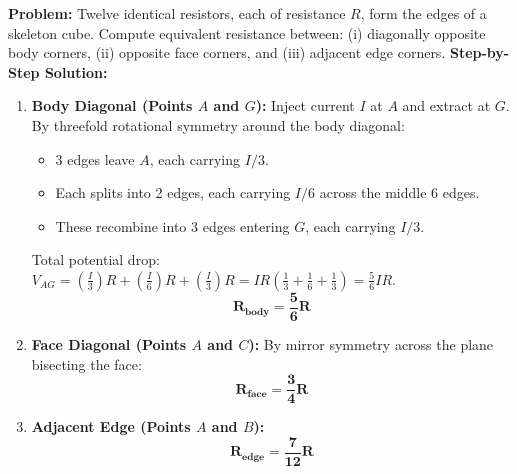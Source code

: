\documentclass[10pt,twoside,openright]{book}
\begin{document}
\begin{usecasebox}
\textbf{Problem:} Twelve identical resistors, each of resistance $R$, form the edges of a skeleton cube. Compute equivalent resistance between: (i) diagonally opposite body corners, (ii) opposite face corners, and (iii) adjacent edge corners.
\textbf{Step-by-Step Solution:}
\begin{enumerate}
  \item \textbf{Body Diagonal (Points $A$ and $G$):}
  Inject current $I$ at $A$ and extract at $G$. By threefold rotational symmetry around the body diagonal:
  \begin{itemize}
    \item 3 edges leave $A$, each carrying $I/3$.
    \item Each splits into 2 edges, each carrying $I/6$ across the middle 6 edges.
    \item These recombine into 3 edges entering $G$, each carrying $I/3$.
  \end{itemize}
  Total potential drop: $V_{AG} = \left(\frac{I}{3}\right)R + \left(\frac{I}{6}\right)R + \left(\frac{I}{3}\right)R = I R \left(\frac{1}{3} + \frac{1}{6} + \frac{1}{3}\right) = \frac{5}{6} I R$.
  \begin{equation}
    \mathbf{R_{\text{body}} = \frac{5}{6} R}
  \end{equation}
  \item \textbf{Face Diagonal (Points $A$ and $C$):}
  By mirror symmetry across the plane bisecting the face:
  \begin{equation}
    \mathbf{R_{\text{face}} = \frac{3}{4} R}
  \end{equation}
  \item \textbf{Adjacent Edge (Points $A$ and $B$):}
  \begin{equation}
    \mathbf{R_{\text{edge}} = \frac{7}{12} R}
  \end{equation}
\end{enumerate}
\end{usecasebox}
\end{document}
